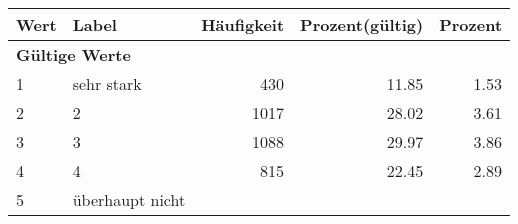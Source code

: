      \begin{longtable}{lXrrr}
     \toprule
     \textbf{Wert} & \textbf{Label} & \textbf{Häufigkeit} & \textbf{Prozent(gültig)} & \textbf{Prozent} \\
     \endhead
     \midrule
     \multicolumn{5}{l}{\textbf{Gültige Werte}}\\

     1 &
     \multicolumn{1}{X}{ sehr stark   } &


       \num{430} &
       \num[round-mode=places,round-precision=2]{11,85} &
         \num[round-mode=places,round-precision=2]{1,53} \\

     2 &
     \multicolumn{1}{X}{ 2   } &


       \num{1017} &
       \num[round-mode=places,round-precision=2]{28,02} &
         \num[round-mode=places,round-precision=2]{3,61} \\

     3 &
     \multicolumn{1}{X}{ 3   } &


       \num{1088} &
       \num[round-mode=places,round-precision=2]{29,97} &
         \num[round-mode=places,round-precision=2]{3,86} \\

     4 &
     \multicolumn{1}{X}{ 4   } &


       \num{815} &
       \num[round-mode=places,round-precision=2]{22,45} &
         \num[round-mode=places,round-precision=2]{2,89} \\

     5 &
     \multicolumn{1}{X}{ überhaupt nicht   } &



\end{longtable}
